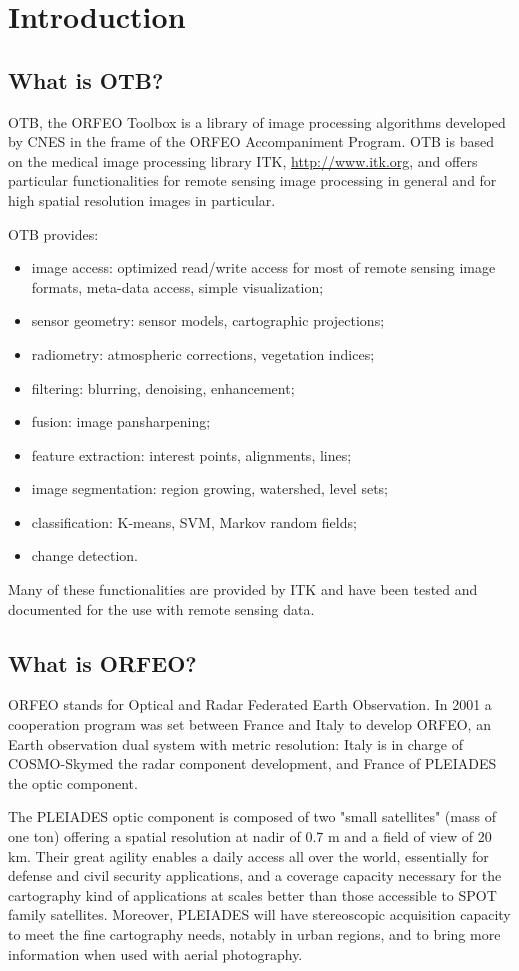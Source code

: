 \section{Introduction}
\subsection{What is OTB?}
OTB, the ORFEO Toolbox is a library of image processing algorithms developed by CNES in the
frame of the ORFEO Accompaniment Program. 
OTB is based on the medical image processing library ITK, \url{http://www.itk.org}, and offers
particular functionalities for remote sensing image processing in
general and for high spatial resolution images in particular.

OTB provides:
\begin{itemize}
\item image access: optimized read/write access for most of remote sensing
image formats, meta-data access, simple visualization;
\item sensor geometry: sensor models, cartographic projections;
\item radiometry: atmospheric corrections, vegetation indices;
\item filtering: blurring, denoising, enhancement;
\item fusion: image pansharpening;
\item feature extraction: interest points, alignments, lines;
\item image segmentation: region growing, watershed, level sets;
\item classification: K-means, SVM, Markov random fields; 
\item change detection.  
\end{itemize}


Many of these functionalities are provided by ITK and have been tested
and documented for the use with remote sensing data.

\subsection{What is ORFEO?}
ORFEO stands for Optical and Radar Federated Earth Observation.  In
2001 a cooperation program was set between France and Italy to develop
ORFEO, an Earth observation dual system with metric resolution: Italy
is in charge of COSMO-Skymed the radar component development, and
France of PLEIADES the optic component.

The PLEIADES optic component is composed of two "small satellites"
(mass of one ton) offering a spatial resolution at nadir of 0.7 m and
a field of view of 20 km. Their great agility enables a daily access
all over the world, essentially for defense and civil security
applications, and a coverage capacity necessary for the cartography
kind of applications at scales better than those accessible to SPOT
family satellites. Moreover, PLEIADES will have stereoscopic
acquisition capacity to meet the fine cartography needs, notably in
urban regions, and to bring more information when used with aerial
photography.

